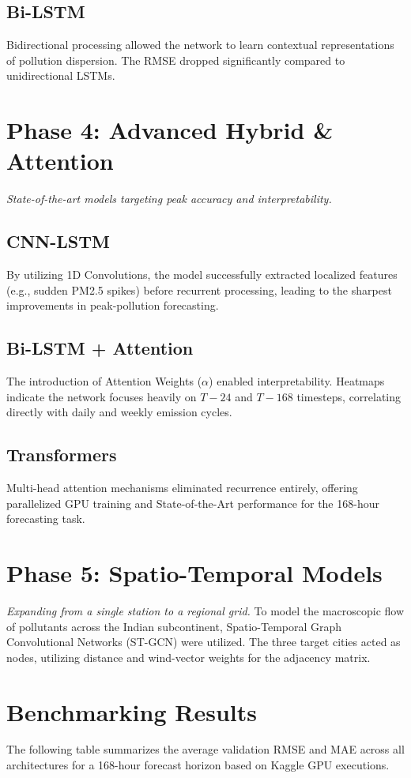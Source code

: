 \documentclass[11pt,a4paper,oneside]{book}
\begin{document}
\section{Bi-LSTM}
Bidirectional processing allowed the network to learn contextual representations of pollution dispersion. The RMSE dropped significantly compared to unidirectional LSTMs.

\chapter{Phase 4: Advanced Hybrid \& Attention}
\textit{State-of-the-art models targeting peak accuracy and interpretability.}

\section{CNN-LSTM}
By utilizing 1D Convolutions, the model successfully extracted localized features (e.g., sudden PM2.5 spikes) before recurrent processing, leading to the sharpest improvements in peak-pollution forecasting.

\section{Bi-LSTM + Attention}
The introduction of Attention Weights ($\alpha$) enabled interpretability. Heatmaps indicate the network focuses heavily on $T-24$ and $T-168$ timesteps, correlating directly with daily and weekly emission cycles.

\section{Transformers}
Multi-head attention mechanisms eliminated recurrence entirely, offering parallelized GPU training and State-of-the-Art performance for the 168-hour forecasting task.

\chapter{Phase 5: Spatio-Temporal Models}
\textit{Expanding from a single station to a regional grid.}
To model the macroscopic flow of pollutants across the Indian subcontinent, Spatio-Temporal Graph Convolutional Networks (ST-GCN) were utilized. The three target cities acted as nodes, utilizing distance and wind-vector weights for the adjacency matrix.

\chapter{Benchmarking Results}
The following table summarizes the average validation RMSE and MAE across all architectures for a 168-hour forecast horizon based on Kaggle GPU executions.
\end{document}
